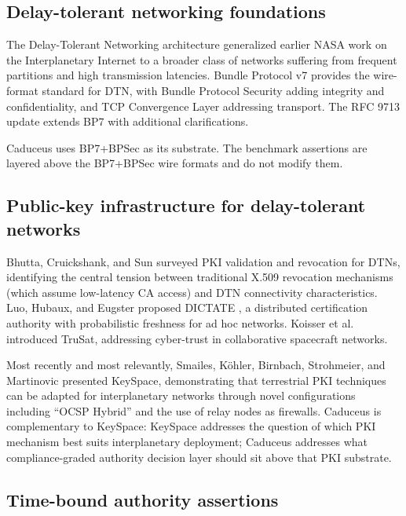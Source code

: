 \documentclass[conference]{IEEEtran}
\begin{document}
\subsection{Delay-tolerant networking foundations}

The Delay-Tolerant Networking architecture \cite{cerf2007dtn} generalized earlier NASA work on the Interplanetary Internet \cite{burleigh2003ipn,burleigh2003dtn} to a broader class of networks suffering from frequent partitions and high transmission latencies. Bundle Protocol v7 \cite{rfc9171} provides the wire-format standard for DTN, with Bundle Protocol Security \cite{rfc9172,rfc9173} adding integrity and confidentiality, and TCP Convergence Layer \cite{rfc9174} addressing transport. The RFC 9713 update \cite{rfc9713} extends BP7 with additional clarifications.

Caduceus uses BP7+BPSec as its substrate. The benchmark assertions are layered above the BP7+BPSec wire formats and do not modify them.

\subsection{Public-key infrastructure for delay-tolerant networks}

Bhutta, Cruickshank, and Sun \cite{bhutta2017dtn} surveyed PKI validation and revocation for DTNs, identifying the central tension between traditional X.509 revocation mechanisms (which assume low-latency CA access) and DTN connectivity characteristics. Luo, Hubaux, and Eugster proposed DICTATE \cite{luo2005dictate}, a distributed certification authority with probabilistic freshness for ad hoc networks. Koisser et al. \cite{koisser2022trusat} introduced TruSat, addressing cyber-trust in collaborative spacecraft networks.

Most recently and most relevantly, Smailes, K\"ohler, Birnbach, Strohmeier, and Martinovic \cite{smailes2024keyspace} presented KeySpace, demonstrating that terrestrial PKI techniques can be adapted for interplanetary networks through novel configurations including ``OCSP Hybrid'' and the use of relay nodes as firewalls. Caduceus is complementary to KeySpace: KeySpace addresses the question of which PKI mechanism best suits interplanetary deployment; Caduceus addresses what compliance-graded authority decision layer should sit above that PKI substrate.

\subsection{Time-bound authority assertions}
\end{document}
